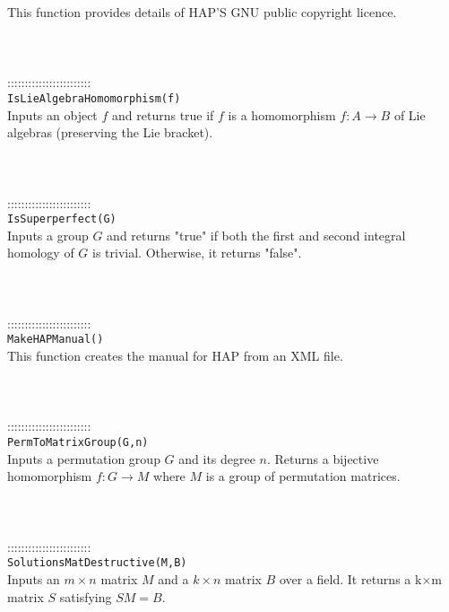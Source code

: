 \documentclass[a4paper,11pt]{report}
\begin{document}
{ This function provides details of HAP'S GNU public copyright licence. \\
 \\
 \\
 \\
 ::::::::::::::::::::::::\\
 \texttt{IsLieAlgebraHomomorphism(f) }\\
 

 Inputs an object $f$ and returns true if $f$ is a homomorphism $f:A \longrightarrow B$ of Lie algebras (preserving the Lie bracket). \\
 \\
 \\
 \\
 ::::::::::::::::::::::::\\
 \texttt{IsSuperperfect(G) }\\
 

 Inputs a group $G$ and returns "true" if both the first and second integral homology of $G$ is trivial. Otherwise, it returns "false". \\
 \\
 \\
 \\
 ::::::::::::::::::::::::\\
 \texttt{MakeHAPManual()}\\
 

 This function creates the manual for HAP from an XML file. \\
 \\
 \\
 \\
 ::::::::::::::::::::::::\\
 \texttt{PermToMatrixGroup(G,n) }\\
 

 Inputs a permutation group $G$ and its degree $n$. Returns a bijective homomorphism $f:G \longrightarrow M$ where $M$ is a group of permutation matrices. \\
 \\
 \\
 \\
 ::::::::::::::::::::::::\\
 \texttt{SolutionsMatDestructive(M,B) }\\
 

 Inputs an $m{\ensuremath{\times}}n$ matrix $M$ and a $k{\ensuremath{\times}}n$ matrix $B$ over a field. It returns a k{\ensuremath{\times}}m matrix $S$ satisfying $SM=B$. 

}
\end{document}
